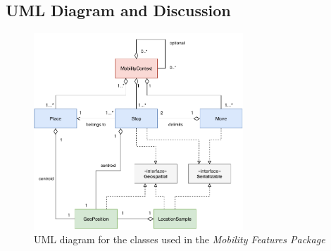 \subsection{UML Diagram and Discussion}

\begin{figure}[h]
    \centering
    \includegraphics[width=0.7\textwidth]{images/diagrams/data-model-diagram.pdf}
    \caption{UML diagram for the classes used in the \textit{Mobility Features Package}}
    \label{fig:my_label}
\end{figure}



